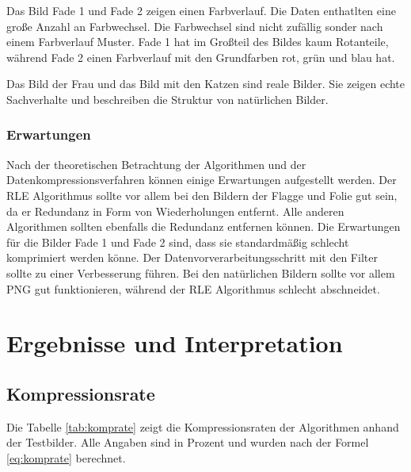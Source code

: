 \documentclass[conference]{IEEEtran}
\begin{document}
Das Bild Fade 1 und Fade 2 zeigen einen Farbverlauf.
Die Daten enthatlten eine große Anzahl an Farbwechsel.
Die Farbwechsel sind nicht zufällig sonder nach einem Farbverlauf Muster.
Fade 1 hat im Großteil des Bildes kaum Rotanteile, während
Fade 2 einen Farbverlauf mit den Grundfarben rot, grün und blau hat.

Das Bild der Frau und das Bild mit den Katzen sind reale Bilder.
Sie zeigen echte Sachverhalte und beschreiben die Struktur
von natürlichen Bilder.


\subsubsection{Erwartungen}

Nach der theoretischen Betrachtung der Algorithmen und der
Datenkompressionsverfahren können einige Erwartungen aufgestellt werden.
Der RLE Algorithmus sollte vor allem bei den Bildern der Flagge und Folie
gut sein, da er Redundanz in Form von Wiederholungen entfernt.
Alle anderen Algorithmen sollten ebenfalls die Redundanz entfernen können.
Die Erwartungen für die Bilder Fade 1 und Fade 2 sind, dass sie standardmäßig
schlecht komprimiert werden könne.
Der Datenvorverarbeitungsschritt mit den Filter sollte zu einer Verbesserung führen.
Bei den natürlichen Bildern sollte vor allem PNG gut funktionieren,
während der RLE Algorithmus schlecht abschneidet.



\section{Ergebnisse und Interpretation}

\subsection{Kompressionsrate}

Die Tabelle \ref{tab:komprate} zeigt die Kompressionsraten der Algorithmen
anhand der Testbilder.
Alle Angaben sind in Prozent und wurden nach der Formel \ref{eq:komprate} berechnet.
\end{document}
